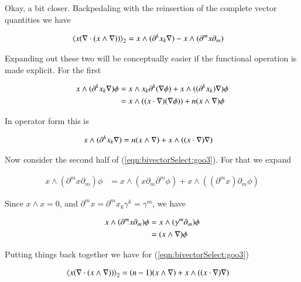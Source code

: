 Okay, a bit closer.  Backpedaling with the reinsertion of the complete vector quantities we have

\begin{align}\label{eqn:bivectorSelect:goo3}
{\left\langle{{ x (\nabla\cdot (x \wedge \nabla)) }}\right\rangle}_{2} &= x \wedge (\partial^k x_k \nabla ) - x \wedge (\partial^m x \partial_m ) 
\end{align}

Expanding out these two will be conceptually easier if the functional operation is made explicit.  For the first

\begin{align*}
x \wedge (\partial^k x_k \nabla ) \phi
&=
x \wedge x_k \partial^k (\nabla \phi)
+x \wedge ((\partial^k x_k) \nabla) \phi \\
&=
x \wedge ((x \cdot \nabla) (\nabla \phi))
+ n (x \wedge \nabla) \phi
\end{align*}

In operator form this is

\begin{align}\label{eqn:bivectorSelect:goo4}
x \wedge (\partial^k x_k \nabla ) &= n (x \wedge \nabla) + x \wedge ((x \cdot \nabla) \nabla ) 
\end{align}

Now consider the second half of (\ref{eqn:bivectorSelect:goo3}).  For that we expand

\begin{align*}
x \wedge (\partial^m x \partial_m ) \phi
&=
x \wedge (x \partial_m \partial^m \phi)
+ x \wedge ((\partial^m x) \partial_m \phi)
\end{align*}

Since $x \wedge x = 0$, and $\partial^m x = \partial^m x_k \gamma^k = \gamma^m$, we have

\begin{align*}
x \wedge (\partial^m x \partial_m ) \phi
&=
x \wedge (\gamma^m \partial_m ) \phi \\
&=
(x \wedge \nabla) \phi
\end{align*}

Putting things back together we have for (\ref{eqn:bivectorSelect:goo3})


\begin{align}\label{eqn:bivectorSelect:goo5}
{\left\langle{{ x (\nabla\cdot (x \wedge \nabla)) }}\right\rangle}_{2} &= (n-1) (x \wedge \nabla) + x \wedge ((x \cdot \nabla) \nabla ) 
\end{align}

